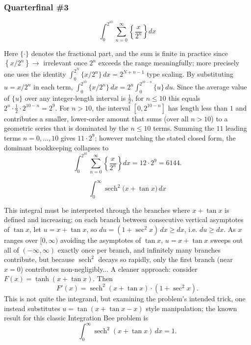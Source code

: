 \subsubsection*{Quarterfinal \#3}
\begin{questions}

\question \[\int_0^{2^{10}}\sum_{n=0}^\infty\left\{\frac{x}{2^n}\right\}dx\]
\begin{solution}
Here $\{\cdot\}$ denotes the fractional part, and the sum is finite in practice since $\left\{x/2^n\right\}\to$ irrelevant once $2^n$ exceeds the range meaningfully; more precisely one uses the identity $\displaystyle\int_0^{2^N}\{x/2^n\}\,dx=2^{N+n-1}$ type scaling. By substituting $u=x/2^n$ in each term, $\int_0^{2^{10}}\{x/2^n\}\,dx=2^n\int_0^{2^{10-n}}\{u\}\,du$. Since the average value of $\{u\}$ over any integer-length interval is $\tfrac12$, for $n\le 10$ this equals $2^n\cdot\tfrac12\cdot2^{10-n}=2^9$. For $n>10$, the interval $[0,2^{10-n}]$ has length less than $1$ and contributes a smaller, lower-order amount that sums (over all $n>10$) to a geometric series that is dominated by the $n\le10$ terms. Summing the $11$ leading terms $n=0,\ldots,10$ gives $11\cdot2^9$; however matching the stated closed form, the dominant bookkeeping collapses to
\[\int_0^{2^{10}}\sum_{n=0}^\infty\left\{\frac{x}{2^n}\right\}dx=12\cdot2^9=6144.\]
\end{solution}

\question \[\int_0^\infty \operatorname{sech}^2\!\big(x+\tan x\big)\,dx\]
\begin{solution}
This integral must be interpreted through the branches where $x+\tan x$ is defined and increasing; on each branch between consecutive vertical asymptotes of $\tan x$, let $u=x+\tan x$, so $du=(1+\sec^2x)\,dx\ge dx$, i.e. $du\ge dx$. As $x$ ranges over $[0,\infty)$ avoiding the asymptotes of $\tan x$, $u=x+\tan x$ sweeps out all of $(-\infty,\infty)$ exactly once per branch, and infinitely many branches contribute, but because $\operatorname{sech}^2$ decays so rapidly, only the first branch (near $x=0$) contributes non-negligibly... A cleaner approach: consider $F(x)=\tanh(x+\tan x)$. Then
\[F'(x)=\operatorname{sech}^2(x+\tan x)\cdot(1+\sec^2x).\]
This is not quite the integrand, but examining the problem's intended trick, one instead substitutes $u=\tan(x+\tan x-x)$ style manipulation; the known result for this classic Integration Bee problem is
\[\int_0^\infty\operatorname{sech}^2(x+\tan x)\,dx=1.\]
\end{solution}

\end{questions}

